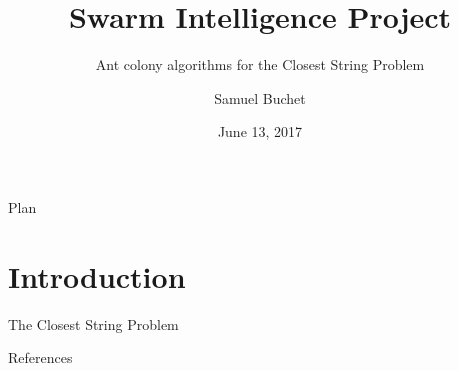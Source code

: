 \documentclass{beamer}
\title{Swarm Intelligence Project}
\subtitle{Ant colony algorithms for the Closest String Problem}
\author{Samuel Buchet}
\institute[Université libre de Bruxelles] %
{
  Swarm Intelligence\\
  Université Libre de Bruxelles
 }
\date{June 13, 2017}
\begin{document}
\begin{frame}
  \titlepage
\end{frame}

\begin{frame}{Plan}
  \tableofcontents
\end{frame}

\section{Introduction}

\begin{frame}{The Closest String Problem}

\end{frame}


\begin{frame}{References}

    \beamertemplateonlinebibitems

    \begin{thebibliography}{1}

    \end{thebibliography}

\end{frame}
\end{document}
